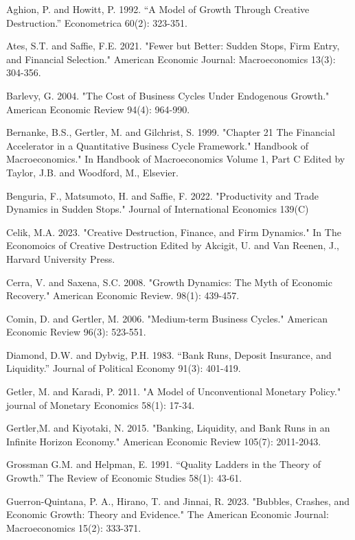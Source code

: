 \documentclass[a4paper,12pt]{article}
\begin{document}
\begin{thebibliography}{9}
    \item Aghion, P. and Howitt, P. 1992. “A Model of Growth Through Creative Destruction.” Econometrica 60(2): 323-351.
    \item Ates, S.T. and Saffie, F.E. 2021. "Fewer but Better: Sudden Stops, Firm Entry, and Financial Selection." American Economic Journal: Macroeconomics 13(3): 304-356.
    \item Barlevy, G. 2004. "The Cost of Business Cycles Under Endogenous Growth." American Economic Review 94(4): 964-990.
    \item Bernanke, B.S., Gertler, M. and Gilchrist, S. 1999. "Chapter 21 The Financial Accelerator in a Quantitative Business Cycle Framework." Handbook of Macroeconomics." In Handbook of Macroeconomics Volume 1, Part C Edited by Taylor, J.B. and Woodford, M., Elsevier.
    \item Benguria, F., Matsumoto, H. and Saffie, F. 2022. "Productivity and Trade Dynamics in Sudden Stops." Journal of International Economics 139(C)
    \item Celik, M.A. 2023. "Creative Destruction, Finance, and Firm Dynamics." In The Economoics of Creative Destruction Edited by Akcigit, U. and Van Reenen, J., Harvard University Press.
    \item Cerra, V. and Saxena, S.C. 2008. "Growth Dynamics: The Myth of Economic Recovery." American Economic Review. 98(1): 439-457.
    \item Comin, D. and Gertler, M. 2006. "Medium-term Business Cycles." American Economic Review 96(3): 523-551.
    \item Diamond, D.W. and Dybvig, P.H. 1983. “Bank Runs, Deposit Insurance, and Liquidity.” Journal of Political Economy 91(3): 401-419.
    \item Getler, M. and Karadi, P. 2011. "A Model of Unconventional Monetary Policy." journal of Monetary Economics 58(1): 17-34.
    \item Gertler,M. and Kiyotaki, N. 2015. "Banking, Liquidity, and Bank Runs in an Infinite Horizon Economy." American Economic Review 105(7): 2011-2043.
    \item Grossman G.M. and Helpman, E. 1991. “Quality Ladders in the Theory of Growth.” The Review of Economic Studies 58(1): 43-61.
    \item Guerron-Quintana, P. A., Hirano, T. and Jinnai, R. 2023. "Bubbles, Crashes, and Economic Growth: Theory and Evidence." The American Economic Journal: Macroeconomics 15(2): 333-371.

\end{thebibliography}
\end{document}

